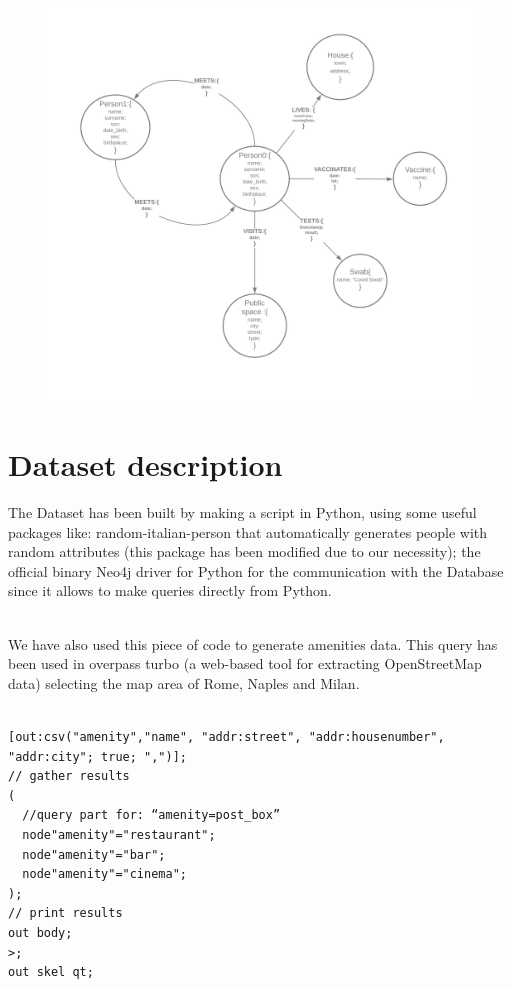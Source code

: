 \documentclass{article}
\begin{document}
\begin{figure} [h]
\centering 
\includegraphics[scale=0.15]{Graph_diagram.png} 
\end{figure}
\newpage

\section{Dataset description}
The Dataset has been built by making a script in Python, using some useful packages like: random-italian-person that automatically generates people with random attributes (this package has been modified due to our necessity); the official binary Neo4j driver for Python for the communication with the Database since it allows to make queries directly from Python. 

\\
\hfill\break
We have also used this piece of code to generate amenities data. This query has been used in overpass turbo (a web-based tool for extracting OpenStreetMap data) selecting the map area of Rome, Naples and Milan.

\begin{lstlisting}[language=cypher, label=lst:cypher-example]

[out:csv("amenity","name", "addr:street", "addr:housenumber", "addr:city"; true; ",")]; 
// gather results 
( 
  //query part for: “amenity=post_box” 
  node"amenity"="restaurant"; 
  node"amenity"="bar"; 
  node"amenity"="cinema"; 
); 
// print results 
out body; 
>; 
out skel qt;
\end{lstlisting}
\newpage
\end{document}
